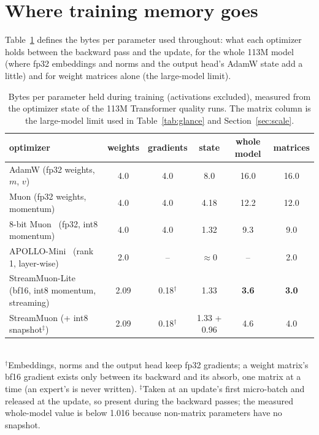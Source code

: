 \documentclass[10pt]{article}
\newcommand{\method}{StreamMuon}\newcommand{\lite}{StreamMuon-Lite}
\begin{document}
\section{Where training memory goes}
\label{sec:background}
Table~\ref{tab:bytes} defines the bytes per parameter used throughout: what each optimizer holds between the backward
pass and the update, for the whole 113M model (where fp32 embeddings and norms and the output head's AdamW state add a
little) and for weight matrices alone (the large-model limit).

\begin{table}[!t]
\centering\small
\caption{Bytes per parameter held during training (activations excluded), measured from the optimizer state of the
113M Transformer quality runs. The matrix column is the large-model limit used in Table~\ref{tab:glance} and
Section~\ref{sec:scale}.}
\label{tab:bytes}
\setlength{\tabcolsep}{4pt}
\begin{tabular}{lccccc}
\toprule
optimizer & weights & gradients & state & whole model & matrices \\
\midrule
AdamW (fp32 weights, $m$, $v$) & 4.0 & 4.0 & 8.0 & 16.0 & 16.0 \\
Muon (fp32 weights, momentum) & 4.0 & 4.0 & 4.18 & 12.2 & 12.0 \\
8-bit Muon~\citep{gupta2025muon8} (fp32, int8 momentum) & 4.0 & 4.0 & 1.32 & 9.3 & 9.0 \\
APOLLO-Mini~\citep{zhu2025apollo} (rank 1, layer-wise) & 2.0 & -- & $\approx$0 & -- & 2.0 \\
\lite{} (bf16, int8 momentum, streaming) & 2.09 & 0.18$^\dagger$ & 1.33 & \textbf{3.6} & \textbf{3.0} \\
\method{} (+ int8 snapshot$^\ddagger$) & 2.09 & 0.18$^\dagger$ & 1.33 + 0.96 & 4.6 & 4.0 \\
\bottomrule
\end{tabular}\\[2pt]
{\footnotesize $^\dagger$Embeddings, norms and the output head keep fp32 gradients; a weight matrix's bf16 gradient exists
only between its backward and its absorb, one matrix at a time (an expert's is never written). $^\ddagger$Taken at an
update's first micro-batch and released at the update, so present during the backward passes; the measured
whole-model value is below 1.016 because non-matrix parameters have no snapshot.}
\end{table}
\end{document}
